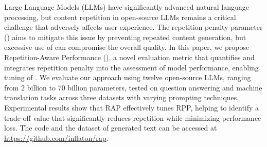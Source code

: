 Large Language Models (LLMs) have significantly advanced natural language processing, but content repetition in open-source LLMs remains a critical challenge that adversely affects user experience. The repetition penalty parameter (\rpp) aims to mitigate this issue by preventing repeated content generation, but excessive use of \rpp can compromise the overall quality.
In this paper, we propose Repetition-Aware Performance (\rap), a novel evaluation metric that quantifies and integrates repetition penalty into the assessment of model performance, enabling tuning of \rpp. 
We evaluate our approach using twelve open-source LLMs, ranging from 2 billion to 70 billion parameters, tested on question answering and machine translation tasks across three datasets with varying prompting techniques. 
Experimental results show that RAP effectively tunes RPP, helping to identify a trade-off value that significantly reduces repetition while minimizing performance loss.
The code and the dataset of generated text can be accessed at \url{https://github.com/inflaton/rap}.

%

%

